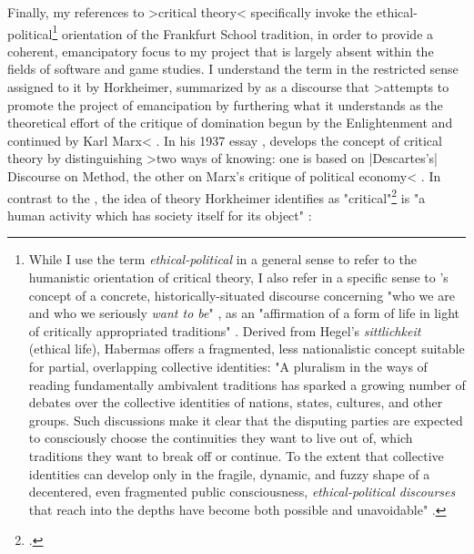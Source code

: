 Finally, my references to >critical theory< specifically invoke the
ethical-political\footnote{
  While I use the term \emph{ethical-political} in a general sense to refer to the humanistic orientation of critical theory, I also refer in a specific sense to \citeauthor{Habermas1987-yd}'s concept of a concrete, historically-situated discourse concerning "who we are and who we seriously \emph{want to be}" \autocite*[180]{Habermas-bfn}, as an "affirmation of a form of life in light of critically appropriated traditions" \autocite[163]{Habermas-bfn}. Derived from Hegel's \emph{sittlichkeit} (ethical life), Habermas offers a fragmented, less nationalistic concept suitable for partial, overlapping collective identities: "A pluralism in the ways of reading fundamentally ambivalent traditions has sparked a growing number of debates over the collective identities of nations, states, cultures, and other groups. Such discussions make it clear that the disputing parties are expected to consciously choose the continuities they want to live out of, which traditions they want to break off or continue. To the extent that collective identities can develop only in the fragile, dynamic, and fuzzy shape of a decentered, even fragmented public consciousness, \emph{ethical-political discourses} that reach into the depths have become both possible and unavoidable" \autocite[97]{Habermas-bfn}.
  } orientation of the Frankfurt School tradition, in order to
provide a coherent, emancipatory focus to my project that is largely absent
within the fields of software and game studies. I understand the term in the
restricted sense assigned to it by Horkheimer, summarized by \citeauthor{Poster1984} as a
discourse that >attempts to promote the project of emancipation by furthering what it understands as the theoretical effort of the critique of domination begun by the Enlightenment and continued by Karl Marx< \autocite*[1]{Poster1989-pt}. In his 1937 essay , \citeauthor{Horkheimer1972-nu} develops the concept of critical theory by distinguishing
>two ways of knowing: one is based on |Descartes's| Discourse on Method, the other on Marx's critique of political economy< \autocite[244]{Horkheimer1972-nu}. In contrast to the , the idea of theory Horkheimer identifies as "critical"\footnote{
  .
} is "a human activity which has society itself for its object" \autocite[206]{Horkheimer1972-nu}:
